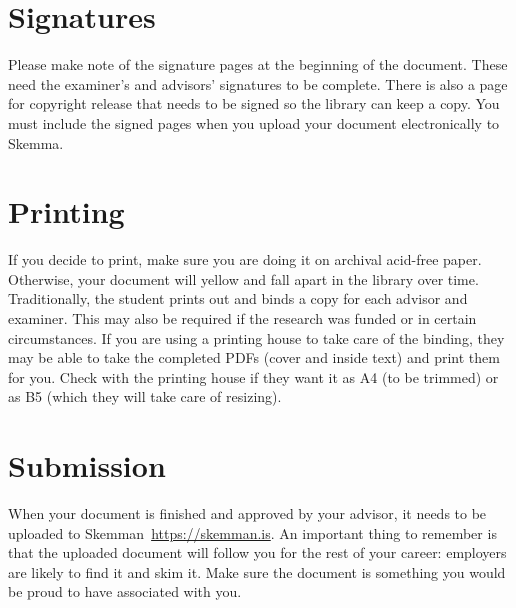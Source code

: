 \section{Signatures}
Please make note of the signature pages at the beginning of the document.
These need the examiner's and advisors' signatures to be complete.
There is also a page for copyright release that needs to be signed so the library can keep a copy.
You must include the signed pages when you upload your document electronically to Skemma.

\section{Printing}
If you decide to print, make sure you are doing it on archival acid-free paper.
Otherwise, your document will yellow and fall apart in the library over time.
Traditionally, the student prints out and binds a copy for each advisor and examiner.
This may also be required if the research was funded or in certain circumstances.
If you are using a printing house to take care of the binding, they may be able to take the completed PDFs (cover and inside text) and print them for you.
Check with the printing house if they want it as A4 (to be trimmed) or as B5 (which they will take care of resizing).

\section{Submission}
When your document is finished and approved by your advisor, it needs to be uploaded to Skemman~\url{https://skemman.is}.
An important thing to remember is that the uploaded document will follow you for the rest of your career:
employers are likely to find it and skim it.
Make sure the document is something you would be proud to have associated with you.

